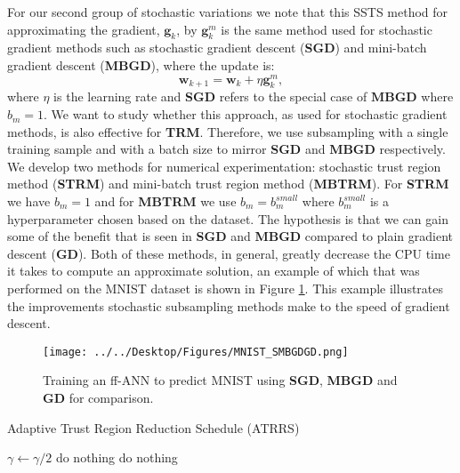 \documentclass[letterpaper,12pt,titlepage,oneside,final]{book}
\begin{document}
	For our second group of stochastic variations we note that this SSTS method for approximating the gradient, $\mathbf{g}_{k}$, by $\mathbf{g}_{k}^{m}$ is the same method used for stochastic gradient methods such as stochastic gradient descent (\textbf{SGD}) and mini-batch gradient descent (\textbf{MBGD}), where the update is:
	\begin{equation}
	\mathbf{w}_{k+1} = \mathbf{w}_{k} + \eta \mathbf{g}_{k}^{m}, 
	\end{equation}
	where $\eta$ is the learning rate and \textbf{SGD} refers to the special case of $\mathbf{MBGD}$ where $b_{m} = 1$. We want to study whether this approach, as used for stochastic gradient methods, is also effective for \textbf{TRM}. Therefore, we use subsampling with a single training sample and with a batch size to mirror \textbf{SGD} and \textbf{MBGD} respectively. We develop two methods for numerical experimentation: stochastic trust region method (\textbf{STRM}) and mini-batch trust region method (\textbf{MBTRM}). For \textbf{STRM} we have $b_{m} = 1$ and for \textbf{MBTRM} we use $b_{m} = b_{m}^{small}$ where $b_{m}^{small}$ is a hyperparameter chosen based on the dataset. The hypothesis is that we can gain some of the benefit that is seen in \textbf{SGD} and \textbf{MBGD} compared to plain gradient descent (\textbf{GD}). Both of these methods, in general, greatly decrease the CPU time it takes to compute an approximate solution, an example of which that was performed on the MNIST dataset \cite{mnist} is shown in Figure \ref{figure:SMBGDGD}. This example illustrates the improvements stochastic subsampling methods make to the speed of gradient descent.
	
	\begin{figure}[h]
		\centering
		\texttt{[image: ../../Desktop/Figures/MNIST\_SMBGDGD.png]}
		\caption{Training an ff-ANN to predict MNIST using \textbf{SGD}, \textbf{MBGD} and \textbf{GD} for comparison. }
		\label{figure:SMBGDGD}
	\end{figure}
	
	\begin{algorithm}
		\caption{Adaptive Trust Region Reduction Schedule (ATRRS)}
		\begin{algorithmic}[1]
			\State $\gamma \gets \gamma / 2$
			\Else
			\State do nothing
			\EndIf
			\Else
			\State do nothing
			\EndIf
			\EndFunction
		\end{algorithmic}	
		\label{algorithm:assrs-simple}	
	\end{algorithm}
	
\end{document}
